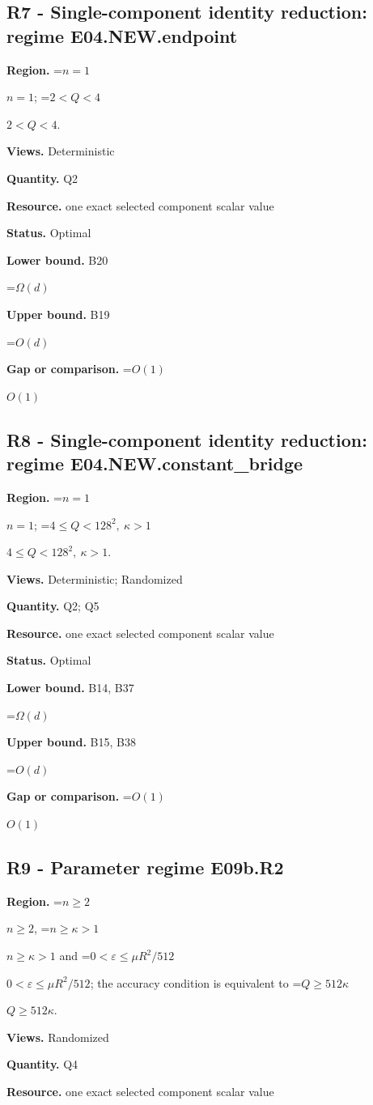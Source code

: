 \documentclass[10pt,a4paper]{article}
\newcommand{\AtlasMath}[1]{\par\begingroup\centering\setbox0=\hbox{$\displaystyle #1$}\ifdim\wd0>1.4\linewidth\typeout{ATLAS WIDE FORMULA: \the\wd0}\fi\ifdim\wd0>\linewidth\resizebox{\linewidth}{!}{\box0}\else\box0\fi\par\endgroup}
\newcommand{\AtlasInlineMath}[1]{\begingroup\setbox0=\hbox{$#1$}\ifdim\wd0>.4\linewidth\endgroup\AtlasMath{#1}\else\endgroup$#1$\fi}
\begin{document}
\subsection{R7 - Single-component identity reduction: regime E04.NEW.endpoint}
\textbf{Region.} \AtlasInlineMath{n=1}; \AtlasInlineMath{2<Q<4}.

\textbf{Views.} Deterministic

\textbf{Quantity.} Q2

\textbf{Resource.} one exact selected component scalar value

\textbf{Status.} Optimal

\textbf{Lower bound.} B20

\AtlasMath{\Omega(d)}
\textbf{Upper bound.} B19

\AtlasMath{O(d)}
\textbf{Gap or comparison.} \AtlasInlineMath{O(1)}

\subsection{R8 - Single-component identity reduction: regime E04.NEW.constant\_bridge}
\textbf{Region.} \AtlasInlineMath{n=1}; \AtlasInlineMath{4\le Q<128^2,\ \kappa>1}.

\textbf{Views.} Deterministic; Randomized

\textbf{Quantity.} Q2; Q5

\textbf{Resource.} one exact selected component scalar value

\textbf{Status.} Optimal

\textbf{Lower bound.} B14, B37

\AtlasMath{\Omega(d)}
\textbf{Upper bound.} B15, B38

\AtlasMath{O(d)}
\textbf{Gap or comparison.} \AtlasInlineMath{O(1)}

\subsection{R9 - Parameter regime E09b.R2}
\textbf{Region.} \AtlasInlineMath{n\ge2}, \AtlasInlineMath{n\ge\kappa>1} and \AtlasInlineMath{0<\varepsilon\le\mu R^2/512}; the accuracy condition is equivalent to \AtlasInlineMath{Q\ge512\kappa}.

\textbf{Views.} Randomized

\textbf{Quantity.} Q4

\textbf{Resource.} one exact selected component scalar value
\end{document}
